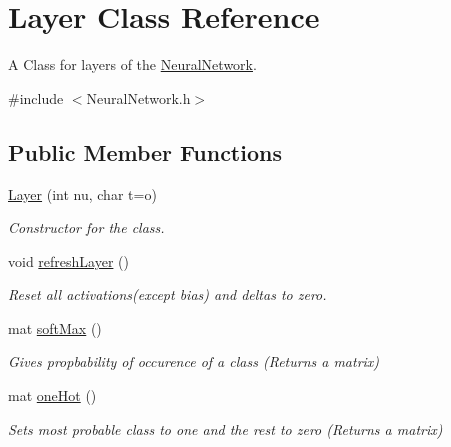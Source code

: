 \hypertarget{classLayer}{}\section{Layer Class Reference}
\label{classLayer}


A Class for layers of the \hyperlink{classNeuralNetwork}{Neural\+Network}.  




{\ttfamily \#include $<$Neural\+Network.\+h$>$}

\subsection*{Public Member Functions}
\begin{DoxyCompactItemize}
\item 
\hyperlink{classLayer_ad4c9c9473c914874e42b16adf59f9d57}{Layer} (int nu, char t=\textquotesingle{}o\textquotesingle{})
\begin{DoxyCompactList}\small\item\em Constructor for the class. \end{DoxyCompactList}\item 
\mbox{\label{classLayer_a41d708b318fe78976dcd7d16811aab00}} 
void \hyperlink{classLayer_a41d708b318fe78976dcd7d16811aab00}{refresh\+Layer} ()
\begin{DoxyCompactList}\small\item\em Reset all activations(except bias) and deltas to zero. \end{DoxyCompactList}\item 
\mbox{\label{classLayer_aaf80bd74a6c446bd7474a771ba12c474}} 
mat \hyperlink{classLayer_aaf80bd74a6c446bd7474a771ba12c474}{soft\+Max} ()
\begin{DoxyCompactList}\small\item\em Gives propbability of occurence of a class (Returns a matrix) \end{DoxyCompactList}\item 
\mbox{\label{classLayer_a3a5f01e9bfb805b9eb3f28948faa10d6}} 
mat \hyperlink{classLayer_a3a5f01e9bfb805b9eb3f28948faa10d6}{one\+Hot} ()
\begin{DoxyCompactList}\small\item\em Sets most probable class to one and the rest to zero (Returns a matrix) \end{DoxyCompactList}\end{DoxyCompactItemize}
